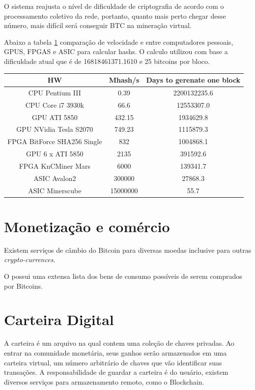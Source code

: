 \documentclass[a4paper,11pt]{article}
\theoremstyle{mytheor}
\begin{document}
O sistema reajusta o nível de dificuldade de criptografia de acordo com o processamento coletivo da rede, portanto, quanto mais perto chegar desse número, mais difícil será conseguir BTC na mineração virtual.

Abaixo a tabela \ref{compare} comparação de velocidade e entre computadores pessoais, GPUS, FPGAS e ASIC para calcular hashs. O calculo utilizou com base a dificuldade atual que é de 16818461371.1610 e 25 bitcoins por bloco.

\begin{table}[!ht]
\centering
\label{compare}
\scriptsize
\begin{tabular}{|c|c|c|}
\hline
\textbf{HW} & \textbf{Mhash/s} & \textbf{Days to gerenate one block} \\ \hline
CPU Pentium III & 0.39 & 2200132235.6 \\ \hline
CPU Core i7 3930k & 66.6 & 12553307.0 \\ \hline
GPU ATI 5850 & 432.15 & 1934629.8 \\ \hline
GPU NVidia Tesla S2070 & 749.23 & 1115879.3 \\ \hline
FPGA BitForce SHA256 Single & 832 & 1004868.1 \\ \hline
GPU 6 x ATI 5850 & 2135 & 391592.6 \\ \hline
FPGA KnCMiner Mars & 6000 & 139341.7 \\ \hline
ASIC Avalon2 & 300000 & 27868.3 \\ \hline
ASIC Minerscube & 15000000 & 55.7 \\ \hline  
\end{tabular}
\end{table}


\section*{Monetização e comércio}

Existem serviços de câmbio do Bitcoin para diversas moedas inclusive para outras \textit{crypto-currences}.

O \cite{trade} possui uma extensa lista dos bens de consumo possíveis de serem comprados por Bitcoins.

\section*{Carteira Digital}
A carteira é um arquivo na qual contem uma coleção de chaves privadas. Ao entrar na comunidade monetária, seus ganhos serão armazenados em uma carteira virtual, um  número arbitrário de chaves que vão identificar suas transações. A responsabilidade de guardar a carteira é do usuário, existem diversos serviços para armazenamento remoto, como o Blockchain.
\end{document}
